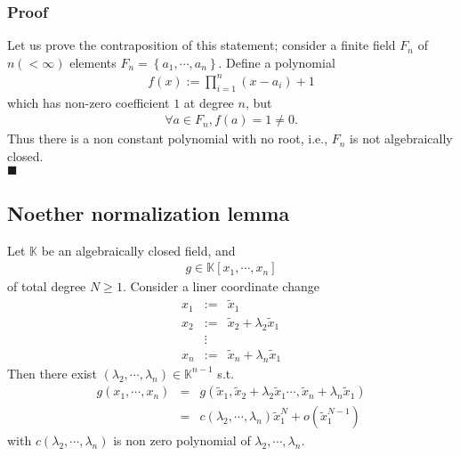 \documentclass[11pt]{book}
\begin{document}
\subsubsection{Proof}
Let us prove the contraposition of this statement; consider a finite field $F_n$ of $n (< \infty) $ elements $F_n = \left\{a_1, \cdots, a_n \right\}$.
Define a polynomial
\begin{eqnarray}
f(x) := \prod_{i=1}^n (x-a_i) + 1
\end{eqnarray}
which has non-zero coefficient $1$ at degree $n$, but
\begin{eqnarray}
\forall a \in F_n, f(a) = 1 \neq 0.
\end{eqnarray}
Thus there is a non constant polynomial with no root, i.e., $F_n$ is not algebraically closed.\\
$\blacksquare$



\subsection{Noether normalization lemma}
\label{NoetherNormalizationLemma}
Let $\mathbb{K}$ be an algebraically closed field, and
\begin{eqnarray}
g \in \mathbb{K}[x_1, \cdots, x_n]
\end{eqnarray}
of total degree $N \geq 1$.
Consider a liner coordinate change
\begin{eqnarray}
x_1 &:=& \tilde{x}_1 \\
x_2 &:=& \tilde{x}_2 + \lambda_2 \tilde{x}_1 \\
&\vdots& \\
x_n &:=& \tilde{x}_n + \lambda_n \tilde{x}_1 
\end{eqnarray}
Then there exist $(\lambda_2, \cdots, \lambda_n) \in \mathbb{K}^{n-1}$ s.t.
\begin{eqnarray}
g(x_1, \cdots, x_n) &=& g(\tilde{x}_1,\tilde{x}_2 + \lambda_2 \tilde{x}_1 \cdots,  \tilde{x}_n + \lambda_n \tilde{x}_1 ) \\
&=& c(\lambda_2, \cdots, \lambda_n) \tilde{x}_1^{N} + o( \tilde{x}_1^{N-1} )
\end{eqnarray}
with $c(\lambda_2, \cdots, \lambda_n)$ is non zero polynomial of $\lambda_2, \cdots, \lambda_n$. 
\end{document}
